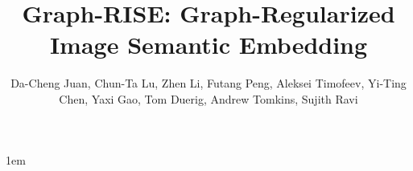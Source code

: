 \documentclass[sigconf]{acmart}
\begin{document}
\emergencystretch 1em

\title{Graph-RISE: Graph-Regularized Image Semantic Embedding}

\author{Da-Cheng Juan, Chun-Ta Lu, Zhen Li, Futang Peng, Aleksei Timofeev, Yi-Ting Chen, Yaxi Gao, Tom Duerig, Andrew Tomkins, Sujith Ravi\vspace{6pt}}


\begin{comment}
\author{Ben Trovato}
\orcid{1234-5678-9012}
\affiliation{\institution{Institute for Clarity in Documentation}
  \streetaddress{P.O. Box 1212}
  \city{Dublin}
  \state{Ohio}
  \postcode{43017-6221}
}
\email{trovato@corporation.com}

\author{G.K.M. Tobin}
\affiliation{\institution{Institute for Clarity in Documentation}
  \streetaddress{P.O. Box 1212}
  \city{Dublin}
  \state{Ohio}
  \postcode{43017-6221}
}
\email{webmaster@marysville-ohio.com}

\author{Lars Th{\o}rv{\"a}ld}
\affiliation{\institution{The Th{\o}rv{\"a}ld Group}
  \streetaddress{1 Th{\o}rv{\"a}ld Circle}
  \city{Hekla}
  \country{Iceland}}
\email{larst@affiliation.org}

\author{Valerie B\'eranger}
\affiliation{\institution{Inria Paris-Rocquencourt}
  \city{Rocquencourt}
  \country{France}
}
\author{Aparna Patel}
\affiliation{\institution{Rajiv Gandhi University}
 \streetaddress{Rono-Hills}
 \city{Doimukh}
 \state{Arunachal Pradesh}
 \country{India}}
\author{Huifen Chan}
\affiliation{\institution{Tsinghua University}
  \streetaddress{30 Shuangqing Rd}
  \city{Haidian Qu}
  \state{Beijing Shi}
  \country{China}
}

\author{Charles Palmer}
\affiliation{\institution{Palmer Research Laboratories}
  \streetaddress{8600 Datapoint Drive}
  \city{San Antonio}
  \state{Texas}
  \postcode{78229}}
\email{cpalmer@prl.com}

\author{John Smith}
\affiliation{\institution{The Th{\o}rv{\"a}ld Group}}
\email{jsmith@affiliation.org}

\author{Julius P.~Kumquat}
\affiliation{\institution{The Kumquat Consortium}}
\email{jpkumquat@consortium.net}
\end{comment}

\renewcommand{\shortauthors}{D.-C. Juan et al.}
\end{document}
